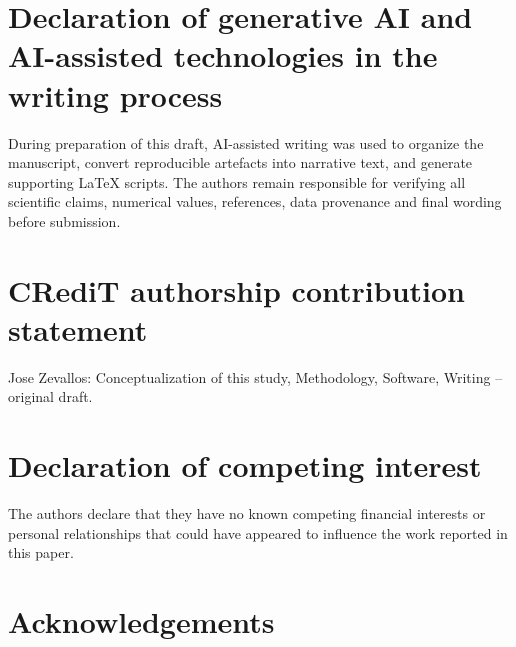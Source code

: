 \documentclass[a4paper,fleqn]{cas-sc}
\begin{document}
\section*{Declaration of generative AI and AI-assisted technologies
in the writing process}

During preparation of this draft, AI-assisted writing was used to
organize the manuscript, convert reproducible artefacts into narrative
text, and generate supporting LaTeX scripts. The authors remain
responsible for verifying all scientific claims, numerical values,
references, data provenance and final wording before submission.

\section*{CRediT authorship contribution statement}

Jose Zevallos: Conceptualization of this study, Methodology, Software,
Writing -- original draft.

\section*{Declaration of competing interest}

The authors declare that they have no known competing financial
interests or personal relationships that could have appeared to
influence the work reported in this paper.

\section*{Acknowledgements}

\printcredits




\end{document}
